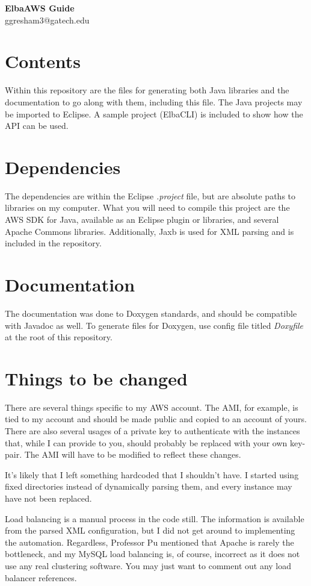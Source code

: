\documentclass[]{article}
\begin{document}
\begin{center}
\textbf{ElbaAWS Guide}\\
ggresham3@gatech.edu\\
\bigskip
\end{center}

\section{Contents}
Within this repository are the files for generating both Java libraries and the documentation to go along with them, including this file. The Java projects may be imported to Eclipse. A sample project (ElbaCLI) is included to show how the API can be used.
\section{Dependencies}
The dependencies are within the Eclipse {\it.project} file, but are absolute paths to libraries on my computer. What you will need to compile this project are the AWS SDK for Java, available as an Eclipse plugin or libraries, and several Apache Commons libraries. Additionally, Jaxb is used for XML parsing and is included in the repository.
\section{Documentation}
The documentation was done to Doxygen standards, and should be compatible with Javadoc as well. To generate files for Doxygen, use config file titled {\it Doxyfile} at the root of this repository.
\section{Things to be changed}
There are several things specific to my AWS account. The AMI, for example, is tied to my account and should be made public and copied to an account of yours. There are also several usages of a private key to authenticate with the instances that, while I can provide to you, should probably be replaced with your own key-pair. The AMI will have to be modified to reflect these changes.

It's likely that I left something hardcoded that I shouldn't have. I started using fixed directories instead of dynamically parsing them, and every instance may have not been replaced.

Load balancing is a manual process in the code still. The information is available from the parsed XML configuration, but I did not get around to implementing the automation. Regardless, Professor Pu mentioned that Apache is rarely the bottleneck, and my MySQL load balancing is, of course, incorrect as it does not use any real clustering software. You may just want to comment out any load balancer references.
\end{document}
